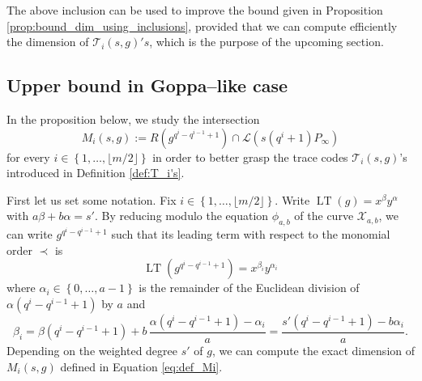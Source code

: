 \documentclass[a4paper]{article}
\theoremstyle{definition}
\theoremstyle{remark}
\newcommand{\calL}{\mathcal{L}}
\newcommand{\calT}{\mathcal{T}}
\newcommand{\calX}{\mathcal{X}}
\newcommand{\set}[1]{\left\{#1\right\}}
\newcommand{\LT}[1]{\operatorname{LT}\left(#1\right)}
\begin{document}
\noindent The above inclusion can be used to improve the bound given in Proposition \ref{prop:bound_dim_using_inclusions}, provided that we can compute efficiently the dimension of $\calT_i(s,g)'s$, which is the purpose of the upcoming section.


\subsection{Upper bound in Goppa--like case}

In the proposition below, we study the intersection 
\begin{equation}\label{eq:def_Mi}
M_i(s,g):=R\left(g^{q^{i}-q^{i-1}+1}\right) \cap \calL(s(q^i+1)P_\infty)
\end{equation}
for every $i \in \set{1,\dots,\lfloor m/2 \rfloor}$ in order to better grasp the trace codes $\calT_i(s,g)$'s introduced in Definition \ref{def:T_i's}.

First let us set some notation. Fix $i \in \set{1,\dots,\lfloor m/2 \rfloor}$. Write $\LT{g}=x^\beta y^\alpha$ with $a\beta + b\alpha=s'$. By reducing modulo the equation $\phi_{a,b}$ of the curve $\calX_{a,b}$, we can write $g^{q^i-q^{i-1}+1}$ such that its leading term with respect to the monomial order $\prec$ is
\begin{equation}\label{eq:gi}
	\LT{g^{q^i-q^{i-1}+1}}=x^{\beta_i} y^{\alpha_i}
\end{equation}
 where $\alpha_i \in \set{0,\dots,a-1}$ is the remainder of the Euclidean division of $\alpha (q^i-q^{i-1}+1)$ by $a$ and 
 \begin{equation}\label{eq:value_beta_prime}
 	\beta_i=\beta(q^i-q^{i-1}+1) + b \, \frac{\alpha(q^i-q^{i-1}+1)-\alpha_i}{a}= \frac{s'(q^i-q^{i-1}+1)-b\alpha_i}{a}.
 \end{equation}
%
Depending on the weighted degree $s'$ of $g$, we can compute the exact dimension of $M_i(s,g)$ defined in Equation \eqref{eq:def_Mi}.
\end{document}
